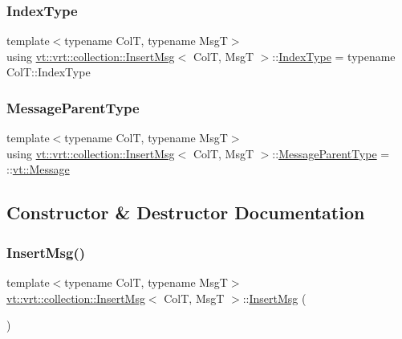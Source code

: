 \subsubsection{\texorpdfstring{Index\+Type}{IndexType}}
{\footnotesize\ttfamily template$<$typename ColT, typename MsgT$>$ \\
using \hyperlink{structvt_1_1vrt_1_1collection_1_1_insert_msg}{vt\+::vrt\+::collection\+::\+Insert\+Msg}$<$ ColT, MsgT $>$\+::\hyperlink{structvt_1_1vrt_1_1collection_1_1_insert_msg_a6d0f0e849ba09859a0cda3e4785de16b}{Index\+Type} =  typename Col\+T\+::\+Index\+Type}

\mbox{\label{structvt_1_1vrt_1_1collection_1_1_insert_msg_aa6e47e1b16beba7083eee26139a40fff}} 
\subsubsection{\texorpdfstring{Message\+Parent\+Type}{MessageParentType}}
{\footnotesize\ttfamily template$<$typename ColT, typename MsgT$>$ \\
using \hyperlink{structvt_1_1vrt_1_1collection_1_1_insert_msg}{vt\+::vrt\+::collection\+::\+Insert\+Msg}$<$ ColT, MsgT $>$\+::\hyperlink{structvt_1_1messaging_1_1_active_msg_ac2e6d93267991027ce78c968b17064c7}{Message\+Parent\+Type} =  \+::\hyperlink{namespacevt_a3a3ddfef40b4c90915fa43cdd5f129ea}{vt\+::\+Message}}



\subsection{Constructor \& Destructor Documentation}
\mbox{\label{structvt_1_1vrt_1_1collection_1_1_insert_msg_a2a1c9b09db00dd3ec8cd54ff994401f7}} 
\subsubsection{\texorpdfstring{Insert\+Msg()}{InsertMsg()}\hspace{0.1cm}{\footnotesize\ttfamily [1/2]}}
{\footnotesize\ttfamily template$<$typename ColT, typename MsgT$>$ \\
\hyperlink{structvt_1_1vrt_1_1collection_1_1_insert_msg}{vt\+::vrt\+::collection\+::\+Insert\+Msg}$<$ ColT, MsgT $>$\+::\hyperlink{structvt_1_1vrt_1_1collection_1_1_insert_msg}{Insert\+Msg} (\begin{DoxyParamCaption}{ }\end{DoxyParamCaption})\hspace{0.3cm}{\ttfamily [default]}}

